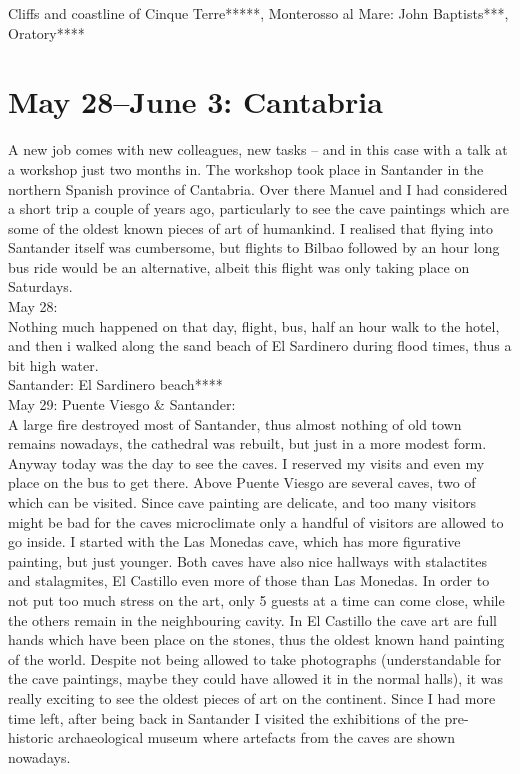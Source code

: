 Cliffs and coastline of Cinque Terre*****, Monterosso al Mare: John Baptists***, Oratory****

\section{May 28--June 3: Cantabria}
\label{Spain2016}

A new job comes with new colleagues, new tasks -- and in this case with a talk at a workshop just two months in. The workshop took place in Santander in the northern Spanish province of Cantabria. Over there Manuel and I had considered a short trip a couple of years ago, particularly to see the cave paintings which are some of the oldest known pieces of art of humankind. I realised that flying into Santander itself was cumbersome, but flights to Bilbao followed by an hour long bus ride would be an alternative, albeit this flight was only taking place on Saturdays.  \\

May 28:\\
Nothing much happened on that day, flight, bus, half an hour walk to the hotel, and then i walked along the sand beach of El Sardinero during flood times, thus a bit high water.\\

Santander: El Sardinero beach****\\

May 29: Puente Viesgo \& Santander:\\
A large fire destroyed most of Santander, thus almost nothing of old town remains nowadays, the cathedral was rebuilt, but just in a more modest form. Anyway today was the day to see the caves. I reserved my visits and even my place on the bus to get there. Above Puente Viesgo are several caves, two of which can be visited. Since cave painting are delicate, and too many visitors might be bad for the caves microclimate only a handful of visitors are allowed to go inside. I started with the Las Monedas cave, which has more figurative painting, but just younger. Both caves have also nice hallways with stalactites and stalagmites, El Castillo even more of those than Las Monedas. In order to not put too much stress on the art, only 5 guests at a time can come close, while the others remain in the neighbouring cavity. In El Castillo the cave art are full hands which have been place on the stones, thus the oldest known hand painting of the world. Despite not being allowed to take photographs (understandable for the cave paintings, maybe they could have allowed it in the normal halls), it was really exciting to see the oldest pieces of art on the continent. Since I had more time left, after being back in Santander I visited the exhibitions of the pre-historic archaeological museum where artefacts from the caves are shown nowadays.\\

